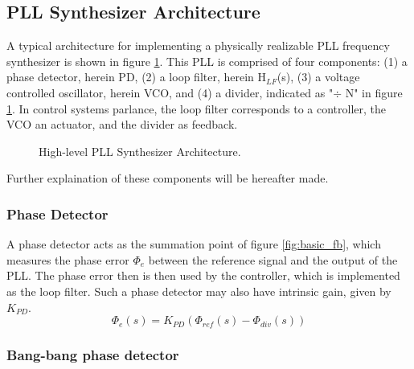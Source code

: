 	\subsection{PLL Synthesizer Architecture}
		A typical architecture for implementing a physically realizable PLL frequency synthesizer \cite{Razavi1996DesignOM} is shown in figure \ref{fig:basic_pll}. This PLL is comprised of four components: (1) a phase detector, herein PD, (2) a loop filter, herein H$_{LF}$(s), (3) a voltage controlled oscillator, herein VCO, and (4) a divider, indicated as "$\div$ N" in figure \ref{fig:basic_pll}. In control systems parlance, the loop filter corresponds to a controller, the VCO an actuator, and the divider as feedback.
		\begin{figure}[htb!]
			\center
			\caption{High-level PLL Synthesizer Architecture.}
			\label{fig:basic_pll}
		\end{figure}
		\FloatBarrier
		Further explaination of these components will be hereafter made.

		\subsubsection{Phase Detector}
		A phase detector acts as the summation point of figure \ref{fig:basic_fb}, which measures the phase error $\Phi_e$ between the reference signal and the output of the PLL. The phase error then is then used by the controller, which is implemented as the loop filter. Such a phase detector may also have intrinsic gain, given by $K_{PD}$.
		\begin{equation}
			\Phi_e(s) = K_{PD}(\Phi_{ref}(s) - \Phi_{div}(s))
		\end{equation}

		\subsubsection{Bang-bang phase detector}\label{bbpd_theory}

